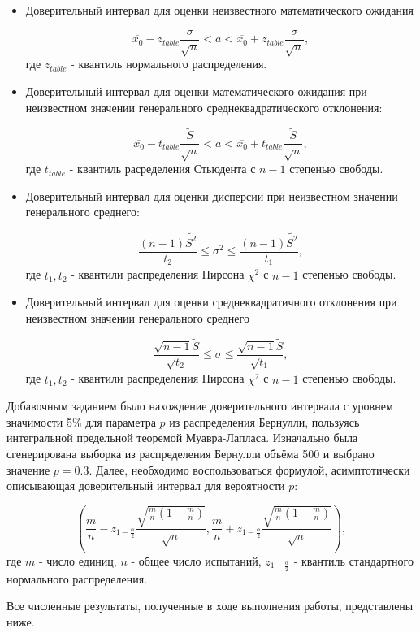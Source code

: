 \begin{itemize}
	\item Доверительный интервал для оценки неизвестного математического ожидания

	\begin{equation}
		\overline{x_0} - z_{table} \frac{\sigma}{\sqrt{n}} < a < \overline{x_0} + z_{table} \frac{\sigma}{\sqrt{n}},
	\end{equation}
	где $z_{table}$ - квантиль нормального распределения.

	\item Доверительный интервал для оценки математического ожидания при неизвестном значении генерального среднеквадратического отклонения:

	\begin{equation}
		\overline{x_0} - t_{table} \frac{\tilde{S}}{\sqrt{n}} < a < \overline{x_0} + t_{table} \frac{\tilde{S}}{\sqrt{n}},
	\end{equation}
	где $t_{table}$ - квантиль расределения Стьюдента с $n - 1$ степенью свободы.

	\item Доверительный интервал для оценки дисперсии при неизвестном значении генерального среднего:

	\begin{equation}
		\frac{(n-1)\tilde{S^2}}{t_2} \leq \sigma^2 \leq \frac{(n-1)\tilde{S^2}}{t_1},
	\end{equation}
	где $t_1, t_2$ - квантили распределения Пирсона $\tilde{\chi^2}$ с $n - 1$ степенью свободы.

	\item Доверительный интервал для оценки среднеквадратичного отклонения при неизвестном значении генерального среднего

	\begin{equation}
		\frac{\sqrt{n-1}\tilde{S}}{\sqrt{t_2}} \leq \sigma \leq \frac{\sqrt{n-1}\tilde{S}}{\sqrt{t_1}},
	\end{equation}
	где $t_1, t_2$ - квантили распределения Пирсона $\tilde{\chi^2}$ с $n - 1$ степенью свободы.

\end{itemize}

Добавочным заданием было нахождение доверительного интервала с уровнем значимости 5\% для параметра $p$ из распределения Бернулли, пользуясь интегральной предельной теоремой Муавра-Лапласа. Изначально была сгенерирована выборка из распределения Бернулли объёма 500 и выбрано значение $p = 0.3$. Далее, необходимо воспользоваться формулой, асимптотически описывающая доверительный интервал для вероятности $p$:

\begin{equation}
	\left(\frac{m}{n} - z_{1 - \frac{\alpha}{2}} \frac{\sqrt{\frac{m}{n} \left(1 - \frac{m}{n} \right)}}{\sqrt{n}},
	\frac{m}{n} + z_{1 - \frac{\alpha}{2}} \frac{\sqrt{\frac{m}{n} \left(1 - \frac{m}{n} \right)}}{\sqrt{n}} \right),
\end{equation}
где $m$ - число единиц, $n$ - общее число испытаний, $z_{1 - \frac{\alpha}{2}}$ - квантиль стандартного нормального распределения.

Все численные результаты, полученные в ходе выполнения работы, представлены ниже.

